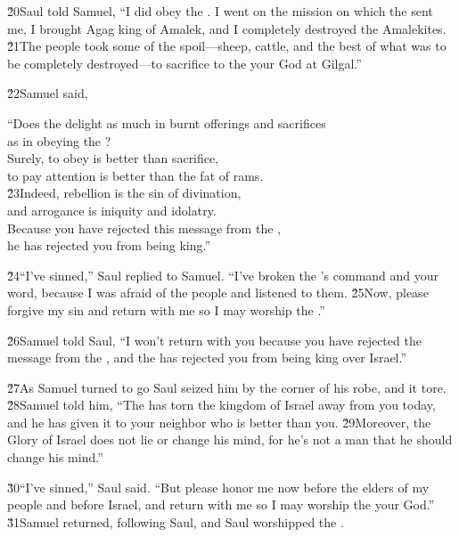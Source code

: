 \v{20}Saul told Samuel, ``I did obey the . I went on the mission on which the  sent me, I brought Agag king of Amalek, and I completely destroyed the Amalekites. \v{21}The people took some of the spoil---sheep, cattle, and the best of what was to be completely destroyed---to sacrifice to the  your God at Gilgal.''

\v{22}Samuel said,

\begin{poetry}
\poeml ``Does the  delight as much in burnt offerings and sacrifices \\
\poemll    as in obeying the ? \\
\poeml Surely, to obey is better than sacrifice, \\
\poemll    to pay attention is better than the fat of rams. \\
\poeml \v{23}Indeed, rebellion is the sin of divination, \\
\poemll    and arrogance is iniquity and idolatry. \\
\poeml Because you have rejected this message from the , \\
\poemll    he has rejected you from being king.''
\end{poetry}

\v{24}``I've sinned,'' Saul replied to Samuel. ``I've broken the 's command and your word, because I was afraid of the people and listened to them. \v{25}Now, please forgive my sin and return with me so I may worship the .''

\v{26}Samuel told Saul, ``I won't return with you because you have rejected the message from the , and the  has rejected you from being king over Israel.''

\v{27}As Samuel turned to go Saul seized him by the corner of his robe, and it tore. \v{28}Samuel told him, ``The  has torn the kingdom of Israel away from you today, and he has given it to your neighbor who is better than you. \v{29}Moreover, the Glory of Israel does not lie or change his mind, for he's not a man that he should change his mind.''

\v{30}``I've sinned,'' Saul said. ``But please honor me now before the elders of my people and before Israel, and return with me so I may worship the  your God.'' \v{31}Samuel returned, following Saul, and Saul worshipped the .

